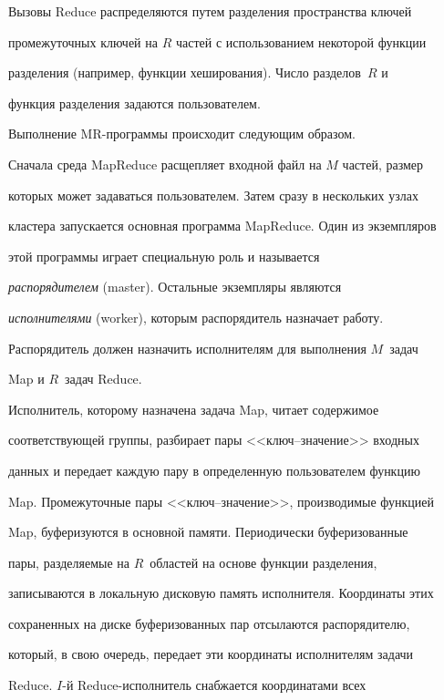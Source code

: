 Вызовы Reduce распределяются путем разделения пространства ключей 


промежуточных ключей на $R$ частей с использованием некоторой функции 


разделения (например, функции хеширования). Число разделов~$R$ и 


функция разделения задаются пользователем. 


      


      Выполнение MR-программы происходит следующим образом. 


Сначала среда MapReduce расщепляет входной файл на $M$ час\-тей, размер 


которых может задаваться пользователем. Затем сразу в нескольких узлах 


кластера запускается основная программа MapReduce. Один из экземпляров 


этой программы играет специальную роль и называется 


\textit{распорядителем} (master). Остальные экземпляры являются 


\textit{исполнителями} (worker), которым распорядитель назначает работу. 


Распорядитель должен назначить исполнителям для выполнения $M$~задач 


Map и $R$~задач Reduce. 


      


      Исполнитель, которому назначена задача Map, читает содержимое 


соответствующей группы, разбирает пары <<ключ--зна\-че\-ние>> входных 


данных и передает каждую пару в определенную пользователем функцию 


Map. Промежуточные пары <<ключ--зна\-че\-ние>>, производимые функцией 


Map, буферизуются в основной памяти. Периодически буферизованные 


пары, разделяемые на $R$~областей на основе функции разделения, 


записываются в локальную дисковую память исполнителя. Координаты этих 


сохраненных на диске буферизованных пар отсылаются распорядителю, 


который, в свою очередь, передает эти координаты исполнителям задачи 


Reduce. $I$-й Reduce-ис\-пол\-ни\-тель снабжается координатами всех 


